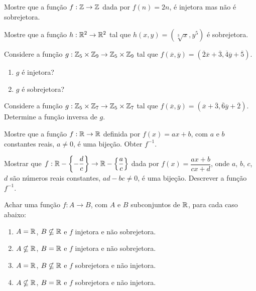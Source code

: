 \documentclass[12pt]{exam}
\begin{document}
\questao Mostre que a fun\c{c}\~ao $f : \mathbb{Z} \to \mathbb{Z}$ dada por $f(n) = 2n$, \'e injetora mas n\~ao \'e sobrejetora.

\vspace{.3cm}

\questao Mostre que a fun\c{c}\~ao $h : \mathbb{R}^2 \to \mathbb{R}^2$ tal que $h(x, y) = (\sqrt[3]{x}, y^5)$ \'e sobrejetora.
\vspace{.3cm}

\questao Considere a fun{\c c}{\~a}o $g : \mathbb{Z}_5 \times \mathbb{Z}_9 \to \mathbb{Z}_5 \times \mathbb{Z}_9$ tal que $f(\overline{x},\overline{y}) = (\overline{2} \overline{x} + \overline{3}, \overline{4}\overline{y} + \overline{5})$.
\begin{enumerate}[label={\alph*})]
	\item $g$ \'e injetora?
	\item $g$ \'e sobrejetora?
\end{enumerate}

\vspace{.3cm}

\questao Considere a fun{\c c}{\~a}o $g : \mathbb{Z}_5 \times \mathbb{Z}_7 \to \mathbb{Z}_5 \times \mathbb{Z}_7$ tal que $f(\overline{x},\overline{y}) = (\overline{x} + \overline{3}, \overline{6}\overline{y} + \overline{2})$. Determine a fun\c{c}\~ao inversa de $g$.

\vspace{.3cm}

\questao Mostre que a fun{\c c}{\~a}o $f : \mathbb{R} \to \mathbb{R}$ definida por $f(x) = ax + b$, com $a$ e $b$ constantes reais, $a \ne 0$, {\'e} uma bije{\c c}{\~a}o. Obter $f^{-1}$.

\vspace{.3cm}

\questao Mostrar que $f : \mathbb{R} - \left\{-\dfrac{d}{c}\right\} \to \mathbb{R}  - \left\{\dfrac{a}{c}\right\}$ dada por $f(x) =  \dfrac{ax + b}{cx + d}$, onde $a$, $b$, $c$, $d$ s{\~a}o n{\'u}meros reais constantes, $ad - bc \ne 0$, {\'e} uma bije{\c c}{\~a}o. Descrever a fun{\c c}{\~a}o $f^{-1}$.

\vspace{.3cm}

\questao Achar uma fun{\c c}{\~a}o $f : A \to B$, com $A$ e $B$ subconjuntos de $\mathbb{R}$, para cada caso abaixo:
\begin{enumerate}[label={\alph*})]
	\item $A = \mathbb{R}$, $B \nsubseteq \mathbb{R}$ e $f$ injetora e n{\~a}o sobrejetora.
	\item $A \nsubseteq \mathbb{R}$, $B = \mathbb{R}$ e $f$ injetora e n{\~a}o sobrejetora.
	\item $A = \mathbb{R}$, $B \nsubseteq \mathbb{R}$ e $f$ sobrejetora e n{\~a}o injetora.
	\item $A \nsubseteq \mathbb{R}$, $B = \mathbb{R}$ e $f$ sobrejetora e n{\~a}o injetora.
\end{enumerate}
\end{document}
